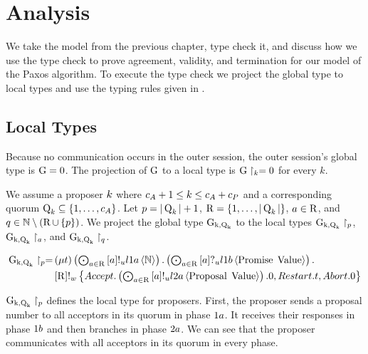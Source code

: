 \chapter{Analysis}
We take the model from the previous chapter, type check it, and discuss how we use the type check to prove agreement, validity, and termination for our model of the Paxos algorithm.
To execute the type check we project the global type to local types and use the typing rules given in \cite{PetersEtal21}.

\section{Local Types}
Because no communication occurs in the outer session, the  outer session's global type is $\operatorname{G} = 0$.
The projection of $\operatorname{G}$ to a local type is $\operatorname{G} \upharpoonright_{k} = 0$ for every $k$.

We assume a proposer $k$ where $c_A + 1 \leq k \leq c_A + c_P$ and a corresponding quorum $\operatorname{Q}_{k}\subseteq\left\{1,\ldots,c_A\right\}$.
Let $p = |\operatorname{Q}_{k}| + 1$, $\operatorname{R} = \left\{1,\ldots,|\operatorname{Q}_{k}|\right\}$, $a \in \operatorname{R}$, and $q \in \mathbb{N}\setminus\left(\operatorname{R} \cup \left\{p\right\}\right)$.
We project the global type $\operatorname{G_{k, \operatorname{Q}_{k}}}$ to the local types $\operatorname{G_{k, \operatorname{Q}_{k}}} \upharpoonright_{p}$, $\operatorname{G_{k, \operatorname{Q}_{k}}} \upharpoonright_{a}$, and $\operatorname{G_{k, \operatorname{Q}_{k}}} \upharpoonright_{q}$.

\begin{align*}
\operatorname{G_{k, \operatorname{Q}_{k}}} \upharpoonright_{p} =
&
    \left(\mu t\right)
    \textstyle\left(\bigodot_{
        a\in\operatorname{R}
    } 
        \left[a\right]!_u l1a \left\langle \mathbb{N} \right\rangle
    \right) .
    \textstyle\left(\bigodot_{
        a\in\operatorname{R}
    } 
        \left[a\right]?_u l1b \left\langle \operatorname{Promise}\; \operatorname{Value} \right\rangle
    \right) .\\
&
    \left[\operatorname{R}\right]!_w \left\{
        \mathnormal{Accept} .
            \textstyle\left(\bigodot_{
                a\in\operatorname{R}
            } 
                \left[a\right]!_u l2a \left\langle \operatorname{Proposal}\; \operatorname{Value} \right\rangle\right).
                0 ,
        \mathnormal{Restart} .
            t ,
        \mathnormal{Abort} .
            0
    \right\}
\end{align*}

$\operatorname{G_{k, \operatorname{Q}_{k}}} \upharpoonright_{p}$ defines the local type for proposers.
First, the proposer sends a proposal number to all acceptors in its quorum in phase $1a$.
It receives their responses in phase $1b$ and then branches in phase $2a$.
We can see that the proposer communicates with all acceptors in its quorum in every phase.

